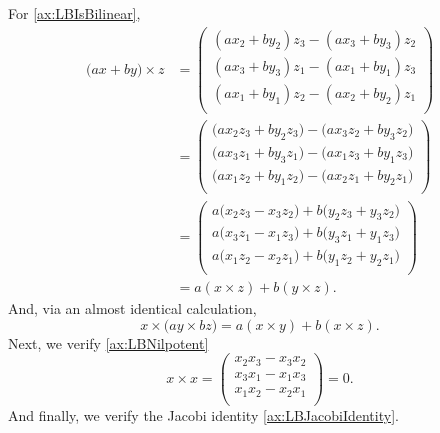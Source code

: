 \documentclass{article}
\begin{document}
For \ref{ax:LBIsBilinear},
\begin{align*}
    \Big( ax + by \Big) \times z
    &=
    \begin{pmatrix}
        (ax_2 + by_2)z_3 - (ax_3 + by_3)z_2 \\
        (ax_3 + by_3)z_1 - (ax_1 + by_1)z_3 \\
        (ax_1 + by_1)z_2 - (ax_2 + by_2)z_1 \\
    \end{pmatrix}
    \\
    &=
    \begin{pmatrix}
        \Big(ax_2z_3 + by_2z_3\Big) - \Big(ax_3z_2 + by_3z_2\Big) \\
        \Big(ax_3z_1 + by_3z_1\Big) - \Big(ax_1z_3 + by_1z_3\Big) \\
        \Big(ax_1z_2 + by_1z_2\Big) - \Big(ax_2z_1 + by_2z_1\Big) \\
    \end{pmatrix}
    \\
    &=
    \begin{pmatrix}
        a\Big(x_2z_3 - x_3z_2\Big) + b\Big(y_2z_3 + y_3z_2\Big) \\
        a\Big(x_3z_1 - x_1z_3\Big) + b\Big(y_3z_1 + y_1z_3\Big) \\
        a\Big(x_1z_2 - x_2z_1\Big) + b\Big(y_1z_2 + y_2z_1\Big) \\
    \end{pmatrix}
    \\
    &=
    a(x \times z) + b (y \times z).
\end{align*}
And, via an almost identical calculation,
\[
    x \times \Big(ay \times bz\Big) = a(x \times y) + b(x \times z).
\]
Next, we verify \ref{ax:LBNilpotent}
\[
    x \times x
    =
    \begin{pmatrix}
        x_2x_3 - x_3x_2 \\
        x_3x_1 - x_1x_3 \\
        x_1x_2 - x_2x_1 \\
    \end{pmatrix}
    =
    0.
\]
And finally, we verify the Jacobi identity \ref{ax:LBJacobiIdentity}.
\end{document}
